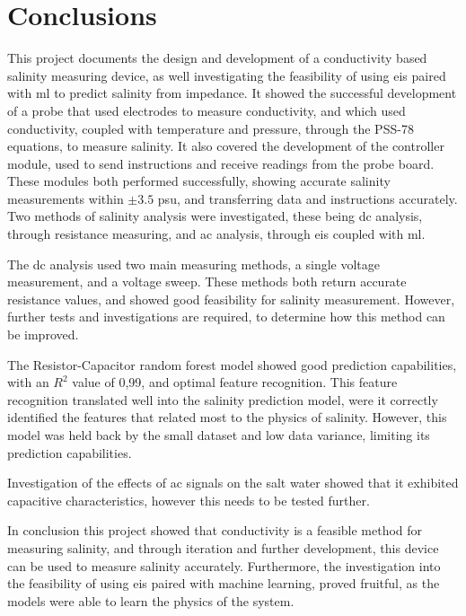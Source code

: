 \chapter{Conclusions}
This project documents the design and development of a conductivity based salinity measuring device, as well investigating the feasibility of using \gls{eis} paired with \gls{ml} to predict salinity from impedance.
It showed the successful development of a probe that used electrodes to measure conductivity, and which used conductivity, coupled with temperature and pressure, through the PSS-78 equations, to measure salinity.
It also covered the development of the controller module, used to send instructions and receive readings from the probe board. These modules both performed successfully, showing accurate salinity measurements within $\pm3.5$ \gls{psu}, and transferring data and instructions accurately.
Two methods of salinity analysis were investigated, these being \gls{dc} analysis, through resistance measuring, and \gls{ac} analysis, through \gls{eis} coupled with \gls{ml}.

The \gls{dc} analysis used two main measuring methods, a single voltage measurement, and a voltage sweep. 
These methods both return accurate resistance values, and showed good feasibility for salinity measurement.
However, further tests and investigations are required, to determine how this method can be improved.

The Resistor-Capacitor random forest model showed good prediction capabilities, with an $R^2$ value of 0,99, and optimal feature recognition. This feature recognition translated well into the salinity prediction model, were it correctly identified the features that related most to the physics of salinity.
However, this model was held back by the small dataset and low data variance, limiting its prediction capabilities.

Investigation of the effects of \gls{ac} signals on the salt water showed that it exhibited capacitive characteristics, however this needs to be tested further.

In conclusion this project showed that conductivity is a feasible method for measuring salinity, and through iteration and further development, this device can be used to measure salinity accurately.
Furthermore, the investigation into the feasibility of using \gls{eis} paired with machine learning, proved fruitful, as the models were able to learn the physics of the system.